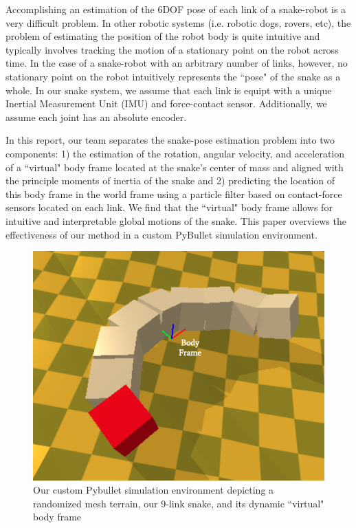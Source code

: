 \documentclass[letterpaper, 10 pt, conference]{ieeeconf}  %
\begin{document}
Accomplishing an estimation of the 6DOF pose of each link of a snake-robot is a very difficult problem. In other robotic systems (i.e. robotic dogs, rovers, etc), the problem of estimating the position of the robot body is quite intuitive and typically involves tracking the motion of a stationary point on the robot across time. In the case of a snake-robot with an arbitrary number of links, however, no stationary point on the robot intuitively represents the ``pose" of the snake as a whole. In our snake system, we assume that each link is equipt with a unique Inertial Measurement Unit (IMU) and force-contact sensor. Additionally, we assume each joint has an absolute encoder. 

In this report, our team separates the snake-pose estimation problem into two components: 1) the estimation of the rotation, angular velocity, and acceleration of a ``virtual" body frame located at the snake's center of mass and aligned with the principle moments of inertia of the snake and 2) predicting the location of this body frame in the world frame using a particle filter based on contact-force sensors located on each link. We find that the ``virtual" body frame allows for intuitive and interpretable global motions of the snake. This paper overviews the effectiveness of our method in a custom PyBullet \cite{pybullet} simulation environment. 

\begin{figure}[H]
    \centering
    \includegraphics[width=0.85\linewidth]{sim_with_VC_frame.png}
    \caption{Our custom Pybullet simulation environment depicting a randomized mesh terrain, our 9-link snake, and its dynamic ``virtual" body frame}
    \label{fig:snake_overview}
\end{figure}
\end{document}
